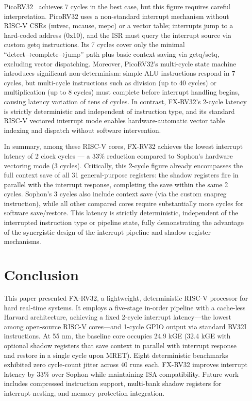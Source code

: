 \documentclass[letterpaper,journal]{IEEEtran}
\begin{document}
PicoRV32~\cite{ref29} achieves 7 cycles in the best case, but this figure requires careful interpretation.
PicoRV32 uses a non-standard interrupt mechanism without RISC-V CSRs (mtvec, mcause, mepc) or a vector table; interrupts jump to a hard-coded address (0x10), and the ISR must query the interrupt source via custom getq instructions.
Its 7 cycles cover only the minimal ``detect→complete→jump'' path plus basic context saving via getq/setq, excluding vector dispatching.
Moreover, PicoRV32's multi-cycle state machine introduces significant non-determinism: simple ALU instructions respond in 7 cycles, but multi-cycle instructions such as division (up to 40 cycles) or multiplication (up to 8 cycles) must complete before interrupt handling begins, causing latency variation of tens of cycles.
In contrast, FX-RV32's 2-cycle latency is strictly deterministic and independent of instruction type, and its standard RISC-V vectored interrupt mode enables hardware-automatic vector table indexing and dispatch without software intervention.

In summary, among these RISC-V cores, FX-RV32 achieves the lowest interrupt latency of 2 clock cycles — a 33\% reduction compared to Sophon's hardware vectoring mode (3 cycles).
Critically, this 2-cycle figure already encompasses the full context save of all 31 general-purpose registers: the shadow registers fire in parallel with the interrupt response, completing the save within the same 2 cycles.
Sophon's 3 cycles also include context save (via the custom snapreg instruction), while all other compared cores require substantially more cycles for software save/restore.
This latency is strictly deterministic, independent of the interrupted instruction type or pipeline state, fully demonstrating the advantage of the synergistic design of the interrupt pipeline and shadow register mechanisms.

\section{Conclusion}
This paper presented FX-RV32, a lightweight, deterministic RISC-V processor for hard real-time systems.
It employs a five-stage in-order pipeline with a cache-less Harvard architecture, achieving a fixed 2-cycle interrupt latency---the lowest among open-source RISC-V cores---and 1-cycle GPIO output via standard RV32I instructions.
At 55 nm, the baseline core occupies 24.9 kGE (32.4 kGE with optional shadow registers that save context in parallel with interrupt response and restore in a single cycle upon MRET).
Eight deterministic benchmarks exhibited zero cycle-count jitter across 40 runs each.
FX-RV32 improves interrupt latency by 33\% over Sophon while maintaining ISA compatibility.
Future work includes compressed instruction support, multi-bank shadow registers for interrupt nesting, and memory protection integration.
\end{document}
